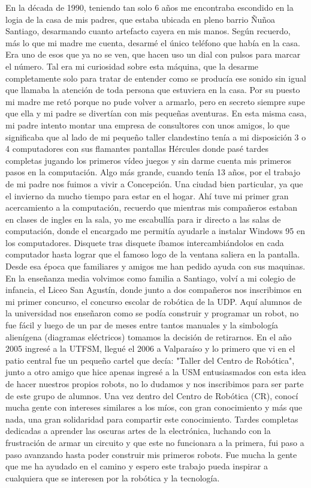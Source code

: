 En la década de 1990, teniendo tan solo 6 años me encontraba escondido en la logia de la casa de mis padres, que estaba ubicada en pleno barrio Ñuñoa Santiago, desarmando cuanto artefacto cayera en mis manos. Según recuerdo, más lo que mi madre me cuenta, desarmé el único teléfono que había en la casa. Era uno de esos que ya no se ven, que hacen uso un dial con pulsos para marcar el número. Tal era mi curiosidad sobre esta máquina, que la desarme completamente solo para tratar de entender como se producía ese sonido sin igual que llamaba la atención de toda persona que estuviera en la casa. Por su puesto mi madre me retó porque no pude volver a armarlo, pero en secreto siempre supe que ella y mi padre se divertían con mis pequeñas aventuras. En esta misma casa, mi padre intento montar una empresa de consultores con unos amigos, lo que significaba que al lado de mi pequeño taller clandestino tenía a mi disposición 3 o 4 computadores con sus flamantes pantallas Hércules donde pasé tardes completas jugando los primeros vídeo juegos y sin darme cuenta mis primeros pasos en la computación. Algo más grande, cuando tenía 13 años, por el trabajo de mi padre nos fuimos a vivir a Concepción. Una ciudad bien particular, ya que el invierno da mucho tiempo para estar en el hogar. Ahí tuve mi primer gran acercamiento a la computación, recuerdo que mientras mis compañeros estaban en clases de ingles en la sala, yo me escabullía para ir directo a las salas de computación, donde el encargado me permitía ayudarle a instalar Windows 95 en los computadores. Disquete tras disquete íbamos intercambiándolos en cada computador hasta lograr que el famoso logo de la ventana saliera en la pantalla. Desde esa época que familiares y amigos me han pedido ayuda con sus maquinas. En la enseñanza media volvimos como familia a Santiago, volví a mi colegio de infancia, el Liceo San Agustín, donde junto a dos compañeros nos inscribimos en mi primer concurso, el concurso escolar de robótica de la UDP. Aquí alumnos de la universidad nos enseñaron como se podía construir y programar un robot, no fue fácil y luego de un par de meses entre tantos manuales y la simbología alienígena (diagramas eléctricos) tomamos la decisión de retirarnos. En el año 2005 ingresé a la UTFSM, llegué el 2006 a Valparaíso y lo primero que vi en el patio central fue un pequeño cartel que decía: "Taller del Centro de Robótica", junto a otro amigo que hice apenas ingresé a la USM entusiasmados con esta idea de hacer nuestros propios robots, no lo dudamos y nos inscribimos para ser parte de este grupo de alumnos. Una vez dentro del Centro de Robótica (CR), conocí mucha gente con intereses similares a los míos, con gran conocimiento y más que nada, una gran solidaridad para compartir este conocimiento. Tardes completas dedicadas a aprender las oscuras artes de la electrónica, luchando con la frustración de armar un circuito y que este no funcionara a la primera, fui paso a paso avanzando hasta poder construir mis primeros robots. Fue mucha la gente que me ha ayudado en el camino y espero este trabajo pueda inspirar a cualquiera que se interesen por la robótica y la tecnología.


